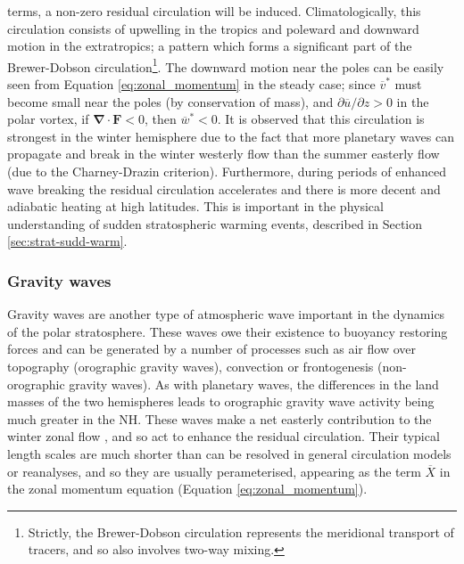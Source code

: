terms, a non-zero residual circulation will be induced. Climatologically, this
circulation consists of upwelling in the tropics and poleward and downward
motion in the extratropics; a pattern which forms a significant part of the
Brewer-Dobson circulation\footnote{Strictly, the Brewer-Dobson circulation
  represents the meridional transport of tracers, and so also involves two-way
  mixing.}. The downward motion near the poles can be easily seen from Equation
\ref{eq:zonal_momentum} in the steady case; since $\overline{v}^*$ must become
small near the poles (by conservation of mass), and
$\partial\overline{u}/\partial z > 0$ in the polar vortex, if
$\mathbf{\nabla\cdot F} < 0$, then $\overline{w}^*<0$. It is observed that this
circulation is strongest in the winter hemisphere due to the fact that more
planetary waves can propagate and break in the winter westerly flow than the
summer easterly flow (due to the Charney-Drazin criterion). Furthermore, during
periods of enhanced wave breaking the residual circulation accelerates and there
is more decent and adiabatic heating at high latitudes. This is important in the
physical understanding of sudden stratospheric warming events, described in
Section \ref{sec:strat-sudd-warm}.


\subsubsection{Gravity waves}

Gravity waves are another type of atmospheric wave important in the dynamics of
the polar stratosphere. These waves owe their existence to buoyancy restoring
forces and can be generated by a number of processes such as air flow over
topography (orographic gravity waves), convection or frontogenesis
(non-orographic gravity waves). As with planetary waves, the differences in the
land masses of the two hemispheres leads to orographic gravity wave activity
being much greater in the NH. These waves make a net easterly contribution to
the winter zonal flow \citep[e.g.,][]{Seviour2012}, and so act to enhance the
residual circulation. Their typical length scales are much shorter than can be
resolved in general circulation models or reanalyses, and so they are usually
perameterised, appearing as the term $\overline{X}$ in the zonal momentum
equation (Equation \ref{eq:zonal_momentum}).


